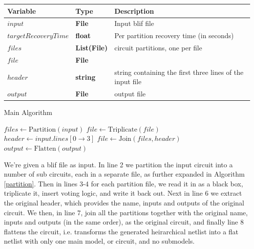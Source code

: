 \documentclass[12pt,final,oneside]{dwThesis} %
\begin{document}
   \begin{algorithm}
      \begin{center}
         \begin{tabular}{lll}
            \toprule
            Variable & Type & Description\\
            \midrule
            $input$ & \textbf{File} &  Input blif file\\
            $targetRecoveryTime$ & \textbf{float} &  Per partition recovery time (in seconds) \\
            $files$ & \textbf{List(File)} &  circuit partitions, one per file \\
            $file$ & \textbf{File} &  \\
            $header$ & \textbf{string} &  string containing the first three lines of the input file \\
            $output$ & \textbf{File} &  output file\\
            \bottomrule
         \end{tabular}
      \end{center}
      \caption{Main Algorithm}\label{main}
      \begin{algorithmic}[1]
         \State $files \gets \mbox{Partition}(input)$
         \State $file \gets \mbox{Triplicate}(file)$
         \EndFor
         \State $header \gets input.lines[0\to 3]$
         \State $file \gets \mbox{Join}(files, header)$
         \State $output \gets \mbox{Flatten}(output)$
         \EndProcedure
      \end{algorithmic}
   \end{algorithm}
   We're given a blif file as input.
   In line 2 we partition the input circuit into a number of sub circuits, each in a separate file, as further expanded in Algorithm \ref{partition}.
   Then in lines 3-4 for each partition file, we read it in as a black box, triplicate it, insert voting logic, and write it back out.
   Next in line 6 we extract the original header, which provides the name, inputs and outputs of the original circuit.
   We then, in line 7, join all the partitions together with the original name, inputs and outputs (in the same order), as the original circuit, and finally line 8 flattens the circuit, i.e. transforms the generated heirarchical netlist into a flat netlist with only one main model, or circuit, and no submodels.

   \newpage
\end{document}
